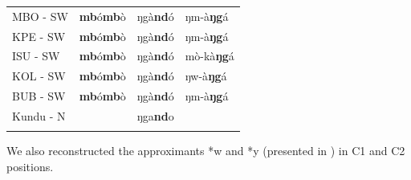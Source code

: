 \documentclass[output=paper,colorlinks,citecolor=brown
]{langscibook}
\begin{document}
\begin{table}
\begin{tabular}{llll}
MBO - SW                  & \textbf{mb}ó\textbf{mb}ò                   & ŋgà\textbf{nd}ó                    & ŋm-à\textbf{ŋg}á              \\
KPE - SW                  & \textbf{mb}ó\textbf{mb}ò                   & ŋgà\textbf{nd}ó                    & ŋm-à\textbf{ŋg}á              \\
ISU - SW                  & \textbf{mb}ó\textbf{mb}ò                   & ŋgà\textbf{nd}ó                    & mò-kà\textbf{ŋg}á            \\
KOL - SW                  & \textbf{mb}ó\textbf{mb}ò                   & ŋgà\textbf{nd}ó                    & ŋw-à\textbf{ŋg}á              \\
BUB - SW                  & \textbf{mb}ó\textbf{mb}ò                   & ŋgà\textbf{nd}ó                    & ŋm-à\textbf{ŋg}á              \\
Kundu - N                 &                            & ŋga\textbf{nd}o                      &     \\ 
   \lspbottomrule
 \end{tabular}
\end{table}

We also reconstructed the approximants *w and *y (presented in ) in C1 and C2 positions. 
\end{document}
